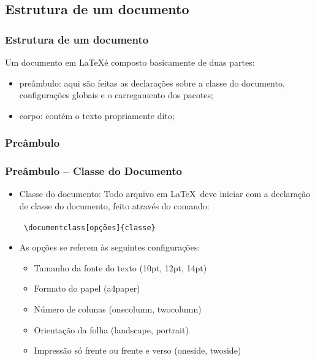 \documentclass{beamer}
\begin{document}
\subsection{Estrutura de um documento}

\begin{frame}
 \frametitle{Estrutura de um documento}
 Um documento em \LaTeX  é composto basicamente de duas partes:
 \begin{itemize}
 \item preâmbulo: aqui são feitas as declarações sobre a classe do documento, configurações globais e o carregamento dos pacotes;
 \item corpo: contém o texto propriamente dito;
 \end{itemize}
\end{frame}

\subsubsection{Preâmbulo}

\begin{frame}[fragile]
 \frametitle{Preâmbulo -- Classe do Documento}
 \begin{itemize}
  \item Classe do documento: Todo arquivo em \LaTeX\ deve iniciar com a declaração 
de classe do documento, feito através do comando:\\
  \begin{center}
  \verb| \documentclass[opções]{classe} |
  \end{center}
  \item As opções se referem às seguintes configurações:
    \begin{itemize}
     \item Tamanho da fonte do texto (10pt, 12pt, 14pt)
     \item Formato do papel (a4paper)
     \item Número de colunas (onecolumn, twocolumn)
     \item Orientação da folha (landscape, portrait)
     \item Impressão só frente ou frente e verso (oneside, twoside)
    \end{itemize}
 \end{itemize}
\end{frame}
\end{document}
